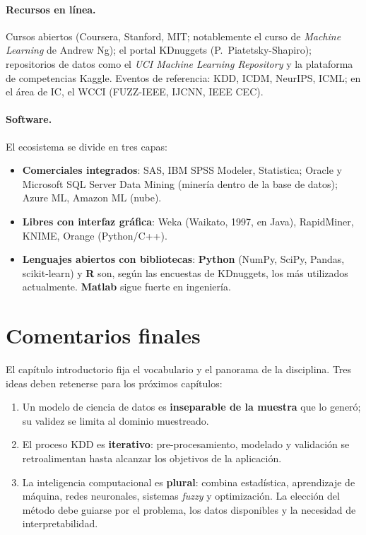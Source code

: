\paragraph{Recursos en línea.} Cursos abiertos (Coursera, Stanford, MIT;
notablemente el curso de \emph{Machine Learning} de Andrew Ng); el portal
KDnuggets (P.~Piatetsky-Shapiro); repositorios de datos como el
\emph{UCI Machine Learning Repository} y la plataforma de competencias
Kaggle. Eventos de referencia: KDD, ICDM, NeurIPS, ICML; en el área de
IC, el WCCI (FUZZ-IEEE, IJCNN, IEEE CEC).

\paragraph{Software.} El ecosistema se divide en tres capas:

\begin{itemize}[leftmargin=1.2cm]
  \item \textbf{Comerciales integrados}: SAS, IBM SPSS Modeler,
        Statistica; Oracle y Microsoft SQL Server Data Mining (minería
        dentro de la base de datos); Azure ML, Amazon ML (nube).
  \item \textbf{Libres con interfaz gráfica}: Weka (Waikato, 1997, en
        Java), RapidMiner, KNIME, Orange (Python/C++).
  \item \textbf{Lenguajes abiertos con bibliotecas}: \textbf{Python}
        (NumPy, SciPy, Pandas, scikit-learn) y \textbf{R} son, según las
        encuestas de KDnuggets, los más utilizados actualmente.
        \textbf{Matlab} sigue fuerte en ingeniería.
\end{itemize}

\section{Comentarios finales}

El capítulo introductorio fija el vocabulario y el panorama de la
disciplina. Tres ideas deben retenerse para los próximos capítulos:

\begin{enumerate}[leftmargin=1.2cm]
  \item Un modelo de ciencia de datos es \textbf{inseparable de la
        muestra} que lo generó; su validez se limita al dominio
        muestreado.
  \item El proceso KDD es \textbf{iterativo}: pre-procesamiento,
        modelado y validación se retroalimentan hasta alcanzar los
        objetivos de la aplicación.
  \item La inteligencia computacional es \textbf{plural}: combina
        estadística, aprendizaje de máquina, redes neuronales, sistemas
        \emph{fuzzy} y optimización. La elección del método debe guiarse
        por el problema, los datos disponibles y la necesidad de
        interpretabilidad.
\end{enumerate}

